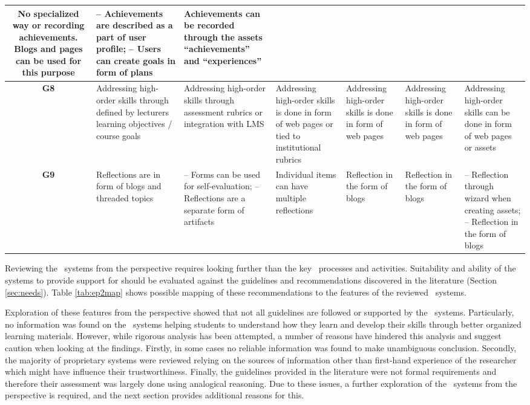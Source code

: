 \begin{sidewaystable}
\begin{tabular}{|c|p{3.25cm}|p{3.25cm}|p{3.25cm}|p{3.25cm}|p{3.25cm}|p{3.25cm}|}
	No specialized way or recording achievements. Blogs and pages can be used for
	this purpose & 
	-- Achievements are described as a part of user profile; \newline -- Users can
	create goals in form of plans & 
	Achievements can be recorded through the assets ``achievements''
	and ``experiences''	\\ \hline 
	\textbf{G8} & 
	Addressing high-order skills through defined by lecturers learning
	objectives / course goals & 
	Addressing high-order skills through assessment rubrics or integration with LMS
	& 
	Addressing high-order skills is done in form of web pages or tied to
	institutional rubrics & 
	Addressing high-order skills is done in form of web pages & 
	Addressing high-order skills is done in form of web pages & 
	Addressing high-order skills can be done in form of web pages or assets \\
	\hline 
	\textbf{G9} & 
	Reflections are in form of blogs and threaded topics & 
	-- Forms can be used for self-evaluation; \newline -- Reflections are a
	separate form of artifacts & 
	Individual items can have multiple reflections & 
	Reflection in the form of blogs & 
	Reflection in the form of blogs & 
	-- Reflection through wizard when creating assets; \newline -- Reflection in
	the form of blogs \\ \hline
	\end{tabular}
\label{tab:ep2map} 
\end{sidewaystable} 

Reviewing the \ep~systems from the \LLLs perspective requires looking further
than the key \ep~processes and activities. Suitability and ability of the
systems to provide support for \LLLs should be evaluated against the guidelines
and recommendations discovered in the literature (Section \ref{sec:needs}). Table
\ref{tab:ep2map} shows possible mapping of these recommendations to the features
of the reviewed \ep~systems. 

Exploration of these features from the \LLLs perspective showed that not all
guidelines are followed or supported by the \ep~systems. Particularly, no
information was found on the \ep~systems helping students to understand how they
learn and develop their skills through better organized learning materials.
However, while rigorous analysis has been attempted, a number of reasons have
hindered this analysis and suggest caution when looking at the findings.
Firstly, in some cases no reliable information was found to make unambiguous
conclusion. Secondly, the majority of proprietary systems were reviewed relying
on the sources of information other than first-hand experience of the researcher
which might have influence their trustworthiness. Finally, the guidelines
provided in the literature were not formal requirements and therefore their
assessment was largely done using analogical reasoning. Due to these issues, a
further exploration of the \ep~systems from the \LLLs perspective is required,
and the next section provides additional reasons for this.

